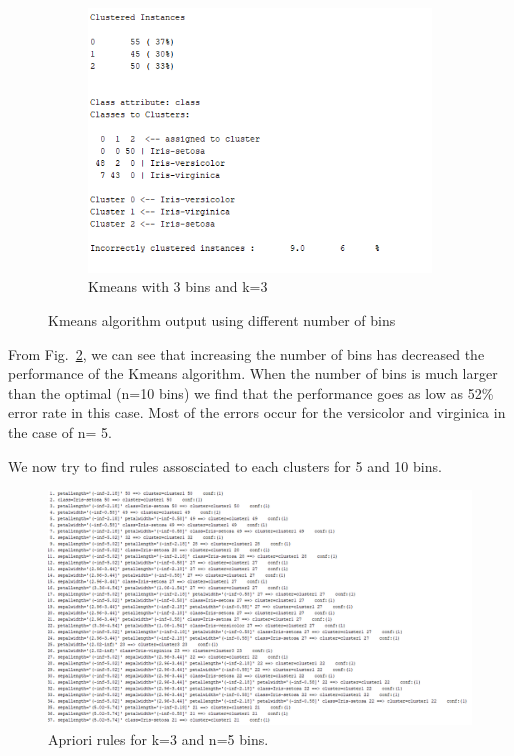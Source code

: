 \documentclass[letterpaper,12pt]{article}
\begin{document}
\begin{figure}[H]
\begin{subfigure}{.5\textwidth}
\end{subfigure}
\begin{subfigure}{.5\textwidth}
  \centering
  \includegraphics[width=.8\linewidth]{3bins_3cl_output}  
  \caption{Kmeans with 3 bins and k=3}
  \label{fig:sub-third_2}
\end{subfigure}
\caption{Kmeans algorithm output using different number of bins}
\label{fig:fig_2}
\end{figure}

From Fig.~\ref{fig:fig_2}, we can see that increasing the number of bins has decreased the performance of the Kmeans algorithm. When the number of bins is much larger than the optimal (n=10 bins) we find that the performance goes as low as 52\% error rate in this case. Most of the errors occur for the versicolor and virginica in the case of n= 5.

We now try to find rules assosciated to each clusters for 5 and 10 bins.

\begin{figure}[H] 
  \centering
      \includegraphics[width=0.8\columnwidth]{5_bins_3cl_apriori_rules}
        \caption{
                \label{fig:5bins_3cl_apriori}  
                Apriori rules for k=3 and n=5 bins.
        }
\end{figure}
\end{document}
